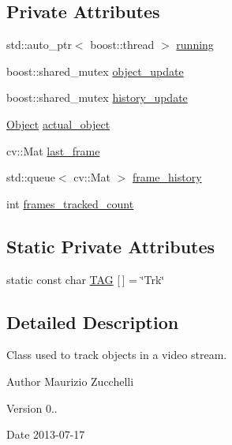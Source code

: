 \subsection*{Private Attributes}
\begin{DoxyCompactItemize}
\item 
std\-::auto\-\_\-ptr$<$ boost\-::thread $>$ \hyperlink{class_i_stuff_1_1_tracker_aa7e9ed78659336011a3ac499be0674e9}{running}
\item 
boost\-::shared\-\_\-mutex \hyperlink{class_i_stuff_1_1_tracker_a395a42f0c4888461053315b24f9c7892}{object\-\_\-update}
\item 
boost\-::shared\-\_\-mutex \hyperlink{class_i_stuff_1_1_tracker_a7d60cb5e6f1102906ad0f3653df0f14b}{history\-\_\-update}
\item 
\hyperlink{class_i_stuff_1_1_object}{Object} \hyperlink{class_i_stuff_1_1_tracker_a304bacfdb3444d47018f0840c8db0106}{actual\-\_\-object}
\item 
cv\-::\-Mat \hyperlink{class_i_stuff_1_1_tracker_a656020d6fe4cac1807961417192aaacb}{last\-\_\-frame}
\item 
std\-::queue$<$ cv\-::\-Mat $>$ \hyperlink{class_i_stuff_1_1_tracker_a5244d9783d84966bb86988e674227a8e}{frame\-\_\-history}
\item 
int \hyperlink{class_i_stuff_1_1_tracker_a4b61344f6dea5d440399261c8d037415}{frames\-\_\-tracked\-\_\-count}
\end{DoxyCompactItemize}
\subsection*{Static Private Attributes}
\begin{DoxyCompactItemize}
\item 
static const char \hyperlink{class_i_stuff_1_1_tracker_a68ef6bf09dbf9db7a6788ed899edb28d}{T\-A\-G} \mbox{[}$\,$\mbox{]} = \char`\"{}Trk\char`\"{}
\end{DoxyCompactItemize}


\subsection{Detailed Description}
Class used to track objects in a video stream. 

\begin{DoxyAuthor}{Author}
Maurizio Zucchelli 
\end{DoxyAuthor}
\begin{DoxyVersion}{Version}
0.. 
\end{DoxyVersion}
\begin{DoxyDate}{Date}
2013-\/07-\/17 
\end{DoxyDate}


